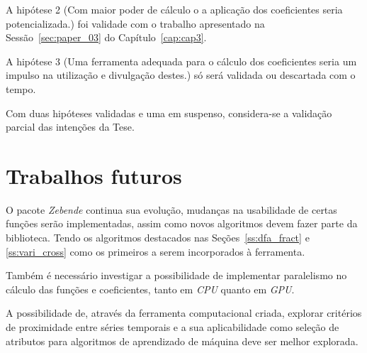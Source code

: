A hipótese 2 (Com maior poder de cálculo o a aplicação dos coeficientes seria potencializada.) foi validade com o trabalho apresentado na Sessão~\ref{sec:paper_03} do Capítulo~\ref{cap:cap3}.

A hipótese 3 (Uma ferramenta adequada para o cálculo dos coeficientes seria um impulso na utilização e divulgação destes.) só será validada ou descartada com o tempo.

Com duas hipóteses validadas e uma em suspenso, considera-se a validação parcial das intenções da Tese.

\section{Trabalhos futuros}

O pacote \emph{Zebende} continua sua evolução, mudanças na usabilidade de certas funções serão implementadas, assim como novos algoritmos devem fazer parte da biblioteca. Tendo os algoritmos destacados nas Seções~\ref{ss:dfa_fract} e \ref{ss:vari_cross} como os primeiros a serem incorporados à ferramenta.

Também é necessário investigar a possibilidade de implementar paralelismo no cálculo das funções e coeficientes, tanto em \emph{CPU} quanto em \emph{GPU}.

A possibilidade de, através da ferramenta computacional criada, explorar critérios de proximidade entre séries temporais e a sua aplicabilidade como seleção de atributos para algoritmos de aprendizado de máquina deve ser melhor explorada.
